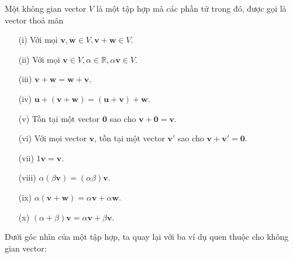 \begin{definition}\label{def2.2.4}
    Một không gian vector \(V\) là một tập hợp mà các phần tử trong đó, được gọi là vector thoả mãn 
    \begin{enumerate}
        \item[(i)] Với mọi \(\mathbf{v}, \mathbf{w}\in V , \mathbf{v}+\mathbf{w}\in V\).
        \item[(ii)] Với mọi \(\mathbf{v}\in V, \alpha\in \mathbb{R}, \alpha\mathbf{v}\in V\).
        \item[(iii)]  \(\mathbf{v}+\mathbf{w}=\mathbf{w}+\mathbf{v}\).
        \item[(iv)]    \(\mathbf{u}+(\mathbf{v}+\mathbf{w})=(\mathbf{u}+\mathbf{v})+\mathbf{w}\).
        \item[(v)] Tồn tại một vector \(\mathbf{0}\) sao cho \(\mathbf{v}+\mathbf{0}=\mathbf{v}\).
        \item[(vi)] Với mọi vector \(\mathbf{v}\), tồn tại một vector \(\mathbf{v}'\) sao cho \(\mathbf{v}+\mathbf{v}'=\mathbf{0}\).
        \item[(vii)] \(1\mathbf{v}=\mathbf{v}\).
        \item[(viii)] \(\alpha(\beta\mathbf{v})=(\alpha\beta)\mathbf{v}\).
        \item[(ix)]  \(\alpha(\mathbf{v}+\mathbf{w})=\alpha\mathbf{v}+\alpha\mathbf{w}\).
        \item[(x)] \((\alpha+\beta)\mathbf{v}=\alpha\mathbf{v}+\beta\mathbf{v}\).    
    \end{enumerate}
\end{definition}
Dưới góc nhìn của một tập hợp, ta quay lại với ba ví dụ quen thuộc cho không gian vector:
